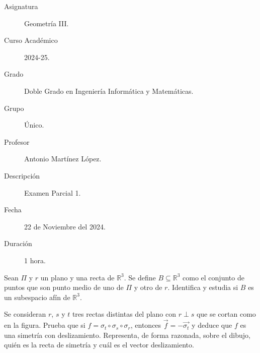 \documentclass[12pt]{article}
\begin{document}

    
    

    
    \begin{description}
        \item[Asignatura] Geometría III.
        \item[Curso Académico] 2024-25.
        \item[Grado] Doble Grado en Ingeniería Informática y Matemáticas.
        \item[Grupo] Único.
        \item[Profesor] Antonio Martínez López.
        \item[Descripción] Examen Parcial 1.
        \item[Fecha] 22 de Noviembre del 2024.
        \item[Duración] 1 hora.
    
    \end{description}
    \newpage

    \begin{ejercicio}[3 puntos]
        Sean $\Pi$ y $r$ un plano y una recta de $\mathbb{R}^3$. Se define $B\subseteq \mathbb{R}^3$ como el conjunto de puntos que son punto medio de uno de $\Pi$ y otro de $r$. Identifica y estudia si $B$ es un subespacio afín de $\mathbb{R}^3$.
    \end{ejercicio}

    \begin{ejercicio}[3 puntos]
        Se consideran $r$, $s$ y $t$ tres rectas distintas del plano con $r\perp s$ que se cortan como en la figura. Prueba que si $f=\sigma_t\circ \sigma_s\circ \sigma_r$, entonces $\vec{f} = -\vec{\sigma_t}$ y deduce que $f$ es una simetría con deslizamiento. Representa, de forma razonada, sobre el dibujo, quién es la recta de simetría y cuál es el vector deslizamiento.
        \begin{figure}[H]
            \centering
        \end{figure}
    \end{ejercicio}
\end{document}
